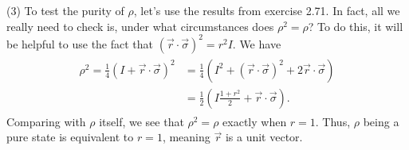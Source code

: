 \documentclass{book}
\begin{document}
    (3) To test the purity of $\rho$, let's use the results from exercise 2.71. In fact, all we really need to check is, under what circumstances does $\rho^2 = \rho$? To do this, it will be helpful to use the fact that $(\vec{r}\cdot \vec{\sigma})^2 = r^2 I$. We have
    \begin{align}
    \begin{aligned}
        \rho^2 = \frac{1}{4}(I + \vec{r}\cdot \vec{\sigma})^2 &= \frac{1}{4}(I^2 + (\vec{r}\cdot\vec{\sigma})^2 + 2 \vec{r}\cdot\vec{\sigma}) \\
        &= \frac{1}{2}\left(I\frac{1+r^2}{2} + \vec{r}\cdot\vec{\sigma}\right).
    \end{aligned}
    \end{align}
    Comparing with $\rho$ itself, we see that $\rho^2 = \rho$ exactly when $r = 1$. Thus, $\rho$ being a pure state is equivalent to $r = 1$, meaning $\vec{r}$ is a unit vector.
\end{document}
